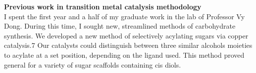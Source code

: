 \documentclass[11pt]{article}
\begin{document}

\textbf{Previous work in transition metal catalysis methodology}\\
I spent the first year and a half of my graduate work in the lab of Professor Vy Dong. During this time, I sought new, streamlined methods of carbohydrate synthesis. We developed a new method of selectively acylating sugars via copper catalysis.7 Our catalysts could distinguish between three similar alcohols moieties to acylate at a set position, depending on the ligand used. This method proved general for a variety of sugar scaffolds containing cis diols.


\eject

%
%

\eject
\end{document}
